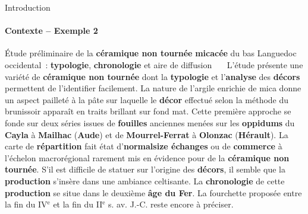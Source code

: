 \begin{frame}{Introduction}\framesubtitle{Contexte -- Exemple 2}
  \begin{exampleblock}{\small
    Étude préliminaire de la \textbf{\normalsize céramique non tournée}
    \textbf{\normalsize micacée} du bas Languedoc occidental~:
    \textbf{\normalsize typologie}, \textbf{\normalsize chronologie} et aire de
    diffusion
  }\justifying\small
    ~~~L'étude présente une variété de \textbf{\normalsize céramique non tournée}
    dont la \textbf{\normalsize typologie} et l'\textbf{\normalsize analyse} des
    \textbf{\normalsize décors} permettent de l'identifier facilement. La nature
    de l'argile enrichie de mica donne un aspect pailleté à la pâte sur laquelle
    le \textbf{\normalsize décor} effectué selon la méthode du brunissoir
    apparaît en traits brillant sur fond mat. Cette première approche se fonde
    sur deux séries issues de \textbf{\normalsize fouilles} anciennes menées sur
    les \textbf{\normalsize oppidums} du \textbf{\normalsize Cayla} à
    \textbf{\normalsize Mailhac} (\textbf{\normalsize Aude}) et de
    \textbf{\normalsize Mourrel-Ferrat} à \textbf{\normalsize Olonzac}
    (\textbf{\normalsize Hérault}). La carte de \textbf{\normalsize répartition}
    fait état d'\textbf{normalsize échanges} ou de \textbf{\normalsize commerce}
    à l'échelon macrorégional rarement mis en évidence pour de la
    \textbf{\normalsize céramique non tournée}. S'il est difficile de statuer
    sur l'origine des \textbf{\normalsize décors}, il semble que la
    \textbf{\normalsize production} s'insère dans une ambiance celtisante. La
    \textbf{\normalsize chronologie} de cette \textbf{\normalsize production} se
    situe dans le deuxième \textbf{\normalsize âge du Fer}. La fourchette
    proposée entre la fin du IV$^\text{e}$ et la fin du II$^\text{e}$ s. av.
    J.-C. reste encore à préciser.
  \end{exampleblock}
\end{frame}

